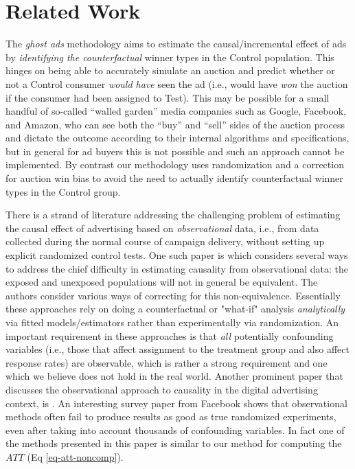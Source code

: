 \documentclass[11pt,a4paper]{article}
\theoremstyle{definition}
\theoremstyle{remark}
\theoremstyle{definition}
\theoremstyle{definition}
\theoremstyle{definition}
\theoremstyle{definition}
\theoremstyle{definition}
\theoremstyle{definition}
\begin{document}
\section{Related Work}\label{sec-related}

The \textit{ghost ads} methodology \cite{Johnson_Ghost_2015} aims to estimate the causal/incremental effect of ads by \textit{identifying the counterfactual} winner types in the Control population. This hinges on being able to accurately simulate an auction and predict whether or not a Control consumer \textit{would have} seen the ad (i.e., would have \textit{won} the auction if the consumer had been assigned to Test).
This may be possible for a small handful of so-called “walled garden” media companies such as Google, Facebook, and Amazon, who can see  both the “buy” and “sell” sides of the auction process and dictate the outcome according to their internal algorithms and specifications, but in general for ad buyers this is not possible and such an approach cannot be implemented.
By contrast our methodology uses randomization and a correction for auction win bias to avoid the need to actually identify counterfactual winner types in the Control group. 

There is a strand of literature addressing the challenging problem of estimating the causal effect of advertising based on \textit{observational} data, i.e., from data collected during the normal course of campaign delivery, without setting up explicit randomized control tests. One such paper is \cite{stitelman2011estimating} which considers several ways to address the chief difficulty in estimating causality from observational data: the exposed and unexposed populations will not in general be equivalent. The authors consider various ways of correcting for this non-equivalence. Essentially these approaches rely on doing a counterfactual or "what-if" analysis \textit{analytically} via fitted models/estimators rather than experimentally via randomization. An important requirement in these approaches is that \textit{all} potentially confounding variables (i.e., those that affect assignment to the treatment group and also affect response rates) are observable, which is rather a strong requirement and one which we believe does not hold in the real world. Another prominent paper that discusses the observational approach to causality in the digital advertising context, is \cite{chan2010evaluating}. An interesting survey paper from Facebook \cite{gordon2016comparison} shows that observational methods often fail to produce results as good as true randomized experiments, even after taking into account thousands of confounding variables. In fact one of the methods presented in this paper is similar to our method for computing the $ATT$ (Eq \ref{eq-att-noncomp}). 
\end{document}
